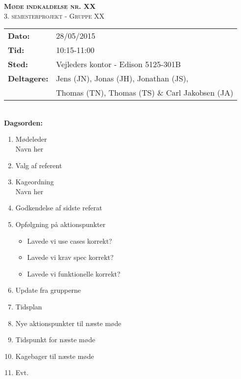 
\newcommand{\HRule}{\rule{\linewidth}{0.1mm}}


	\begin{center}
		{\huge \bfseries \textsc{Møde indkaldelse nr. XX}}\\
		\textsc{\large 3. semesterprojekt - Gruppe XX}\\[0.3cm]
	\end{center}
	\begin{tabular}{ll}
	\large \textbf{Dato:} & 28/05/2015  \\ %
	\large \textbf{Tid:}  & 10:15-11:00 \\ %
	\large \textbf{Sted:} & Vejleders kontor - Edison 5125-301B		\\ %
	\large \textbf{Deltagere:} & Jens (JN), Jonas (JH), Jonathan (JS), \\
	\large \textbf & Thomas (TN),  Thomas (TS) \& Carl Jakobsen (JA)\\
	\end{tabular}\\
	\phantom{\,}\hspace{0.1em} \large \textbf{Dagsorden:}
	\begin{enumerate}
		\itemsep 0.3em 
		\item Mødeleder\\
			Navn her
		\item Valg af referent
		\item Kageordning\\
			Navn her
		\item Godkendelse af sidste referat
		\item Opfølgning på aktionspunkter
		\begin{itemize}
			\itemsep 0.3em 
			\item Lavede vi use cases korrekt?
			\item Lavede vi krav spec korrekt?
			\item Lavede vi funktionelle korrekt?
		\end{itemize}
		\item Update fra grupperne
		\item Tidsplan
		\item Nye aktionspunkter til næste møde
		\item Tidspunkt for næste møde
		\item Kagebager til næste møde
		\item Evt.
	\end{enumerate}
